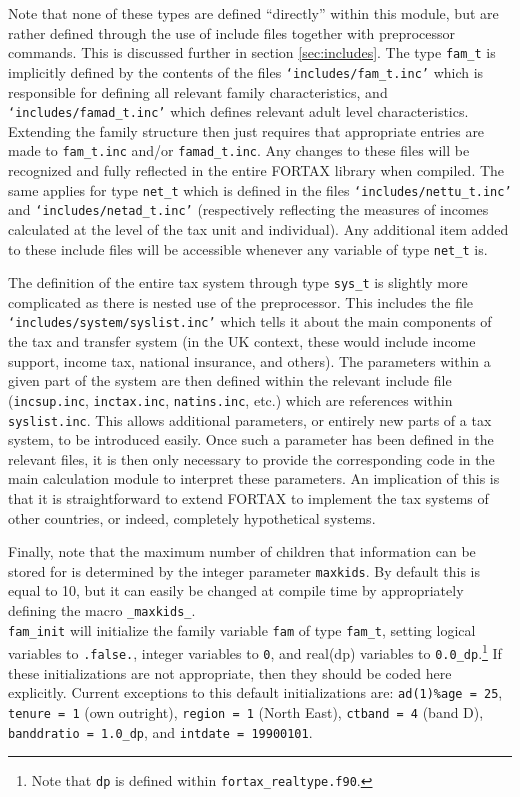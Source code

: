 \documentclass[11pt,thmsa,letter,ukenglish]{article}
\begin{document}
Note that none of these types are defined ``directly'' within this module, but are rather defined through the use of include files together with preprocessor commands. This is discussed further in section \ref{sec:includes}. The type \texttt{fam\_t} is implicitly defined by the contents of the files \texttt{`includes/fam\_t.inc'} which is responsible for defining all relevant family characteristics, and \texttt{`includes/famad\_t.inc'} which defines relevant adult level characteristics. Extending the family structure then just requires that appropriate entries are made to \texttt{fam\_t.inc} and/or \texttt{famad\_t.inc}. Any changes to these files will be recognized and fully reflected in the entire FORTAX library when compiled. The same applies for type \texttt{net\_t} which is defined in the files \texttt{`includes/nettu\_t.inc'} and \texttt{`includes/netad\_t.inc'} (respectively reflecting the measures of incomes calculated at the level of the tax unit and individual). Any additional item added to these include files will be accessible whenever any variable of type \texttt{net\_t} is.

The definition of the entire tax system through type \texttt{sys\_t} is slightly more complicated as there is nested use of the preprocessor. This includes the file \texttt{`includes/system/syslist.inc'} which tells it about the main components of the tax and transfer system (in the UK context, these would include income support, income tax, national insurance, and others). The parameters within a given part of the system are then defined within the relevant include file (\texttt{incsup.inc}, \texttt{inctax.inc}, \texttt{natins.inc}, etc.) which are references within \texttt{syslist.inc}. This allows additional parameters, or entirely new parts of a tax system, to be introduced easily. Once such a parameter has been defined in the relevant files, it is then only necessary to provide the corresponding code in the main calculation module to interpret these parameters. An implication of this is that it is straightforward to extend FORTAX to implement the tax systems of other countries, or indeed, completely hypothetical systems.

Finally, note that the maximum number of children that information can be stored for is determined by
the integer parameter \texttt{maxkids}. By default this is equal to 10, but it can easily be changed at compile time by appropriately defining the macro \texttt{\_maxkids\_}.\\

\noindent\texttt{fam\_init} will initialize the family variable \texttt{fam} of type \texttt{fam\_t}, setting logical variables to \texttt{.false.}, integer variables to \texttt{0}, and real(dp) variables to \texttt{0.0\_dp}.\footnote{Note that \texttt{dp} is defined within \texttt{fortax\_realtype.f90}.} If these initializations are not appropriate, then they should be coded here explicitly. Current exceptions to this default initializations are: \texttt{ad(1)\%age = 25}, \texttt{tenure = 1} (own outright), \texttt{region = 1} (North East), \texttt{ctband = 4} (band D), \texttt{banddratio = 1.0\_dp}, and \texttt{intdate = 19900101}.
\end{document}
